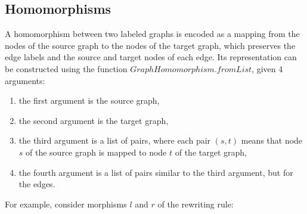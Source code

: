 \subsection{Homomorphisms}
\label{lyonparallel:sec:homomorphisms}
A homomorphism between two labeled graphs is encoded as a mapping from the nodes of the source graph to the nodes of the target graph, which preserves the edge labels and the source and target nodes of each edge. Its representation can be constructed using the function
\colorbox{Ivory2}{$GraphHomomorphism.fromList$}, given 4 arguments:
    \begin{enumerate}
        \item the first argument is the source graph,
        \item the second argument is the target graph,
        \item the third argument is a list of pairs, where each pair $(s,t)$ means that node $s$ of the source graph is mapped to node $t$ of the target graph,
        \item the fourth argument is a list of pairs similar to the third argument, but for the edges.
    \end{enumerate}
For example, consider morphisms $l$ and $r$ of the rewriting rule:
  \begin{center}
    \end{center}

